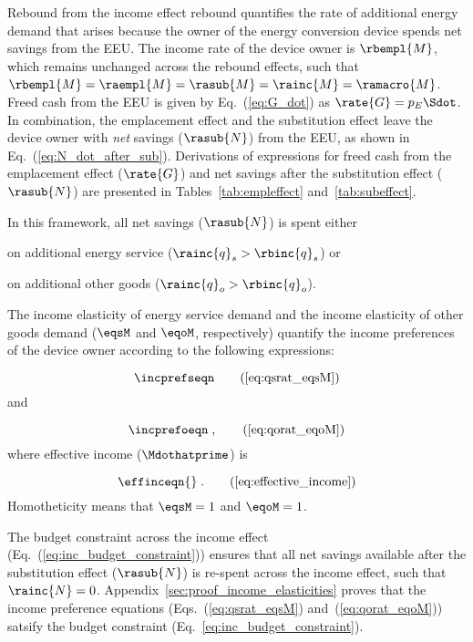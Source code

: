 Rebound from the income effect rebound quantifies the rate of additional energy demand 
that arises because the owner of the energy conversion device spends net
savings from the EEU.
The income rate of the device owner is $\rbempl{M}$, 
which remains unchanged across the rebound effects, 
such that
$\rbempl{M} = \raempl{M} = \rasub{M} = \rainc{M} = \ramacro{M}$.
Freed cash from the EEU is given by Eq.~(\ref{eq:G_dot})
as $\rate{G} = p_E \Sdot$. 
In combination, the emplacement effect and
the substitution effect leave the device owner with
\emph{net} savings ($\rasub{N}$) from the EEU,
as shown in Eq.~(\ref{eq:N_dot_after_sub}).
Derivations of expressions for 
freed cash from the emplacement effect ($\rate{G}$) and
net savings after the substitution effect ($\rasub{N}$)
are presented in Tables~\ref{tab:empleffect} and~\ref{tab:subeffect}.

In this framework, all net savings ($\rasub{N}$) is spent either 
%
\begin{enumerate*}[label={(\roman*)}]
	
  \item on additional energy service ($\rainc{q}_s > \rbinc{q}_s$) or
  
  \item on additional other goods ($\rainc{q}_o > \rbinc{q}_o$).
    
\end{enumerate*}
%
The income elasticity of energy service demand and 
the income elasticity of other goods demand 
($\eqsM$ and $\eqoM$, respectively)
quantify the income preferences of the device owner according to the following expressions:

\begin{equation}
  \incprefseqn \tag{\ref{eq:qsrat_eqsM}}
\end{equation}
%
and

\begin{equation}
  \incprefoeqn \; , \tag{\ref{eq:qorat_eqoM}}
\end{equation}
%
where effective income ($\Mdothatprime$) is

\begin{equation}
  \effinceqn{} \; . \tag{\ref{eq:effective_income}}
\end{equation}
%
Homotheticity means that $\eqsM = 1$ and $\eqoM = 1$.

The budget constraint across the income effect (Eq.~(\ref{eq:inc_budget_constraint})) 
ensures that all net savings available after the substitution effect ($\rasub{N}$) 
is re-spent across the income effect, 
such that $\rainc{N} = 0$.
Appendix~\ref{sec:proof_income_elasticities} proves that
the income preference equations (Eqs.~(\ref{eq:qsrat_eqsM}) and~(\ref{eq:qorat_eqoM})) 
satsify the budget constraint (Eq.~\ref{eq:inc_budget_constraint}).

